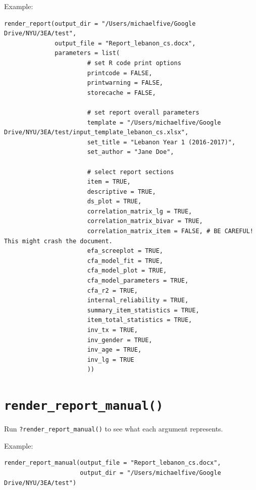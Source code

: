 \documentclass[
]{book}
\begin{document}
Example:

\begin{verbatim}
render_report(output_dir = "/Users/michaelfive/Google Drive/NYU/3EA/test",
              output_file = "Report_lebanon_cs.docx",
              parameters = list(
                       # set R code print options
                       printcode = FALSE,
                       printwarning = FALSE,
                       storecache = FALSE,

                       # set report overall parameters
                       template = "/Users/michaelfive/Google Drive/NYU/3EA/test/input_template_lebanon_cs.xlsx",
                       set_title = "Lebanon Year 1 (2016-2017)",
                       set_author = "Jane Doe",

                       # select report sections
                       item = TRUE,
                       descriptive = TRUE,
                       ds_plot = TRUE,
                       correlation_matrix_lg = TRUE,
                       correlation_matrix_bivar = TRUE,
                       correlation_matrix_item = FALSE, # BE CAREFUL! This might crash the document.
                       efa_screeplot = TRUE,
                       cfa_model_fit = TRUE,
                       cfa_model_plot = TRUE,
                       cfa_model_parameters = TRUE,
                       cfa_r2 = TRUE,
                       internal_reliability = TRUE,
                       summary_item_statistics = TRUE,
                       item_total_statistics = TRUE,
                       inv_tx = TRUE,
                       inv_gender = TRUE,
                       inv_age = TRUE,
                       inv_lg = TRUE
                       ))
\end{verbatim}

\hypertarget{render_report_manual}{%
\section{\texorpdfstring{\texttt{render\_report\_manual()}}{render\_report\_manual()}}\label{render_report_manual}}

Run \texttt{?render\_report\_manual()} to see what each argument represents.

Example:

\begin{verbatim}
render_report_manual(output_file = "Report_lebanon_cs.docx",
                     output_dir = "/Users/michaelfive/Google Drive/NYU/3EA/test")
\end{verbatim}
\end{document}
